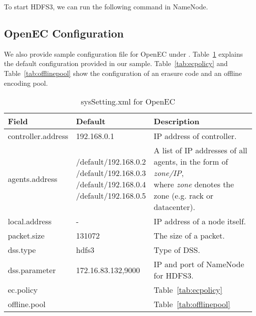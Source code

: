 \documentclass[letterpaper,12pt]{article}
\newcommand{\openec}{{\sf\small OpenEC}\xspace}
\begin{document}
To start HDFS3, we can run the following command in NameNode.

\begin{center}
\noindent{}
\end{center}

\subsection{OpenEC Configuration}

We also provide sample configuration file for \openec under .
Table~\ref{tab:sysSetting} explains the default configuration provided in our sample.
Table~\ref{tab:ecpolicy} and Table~\ref{tab:offlinepool} show the configuration of an
erasure code and an offline encoding pool.

\begin{table}[!t]
\centering
\footnotesize
\renewcommand{\arraystretch}{1.1}
\begin{tabular}{|l|l|l|}
\hline
Field & Default & Description \\
\hline
\hline
controller.address & 192.168.0.1 & IP address of controller. \\
\hline
agents.address & \makecell[l]{/default/192.168.0.2 \\ /default/192.168.0.3 \\ /default/192.168.0.4 \\ /default/192.168.0.5} & \makecell[l]{A list of IP addresses of all agents, in the form of {\sl zone/IP}, \\where {\sl zone} denotes the zone (e.g. rack or datacenter).} \\
\hline
local.address & - & IP address of a node itself. \\ 
\hline
packet.size & 131072 & The size of a packet. \\
\hline
dss.type & hdfs3 & Type of DSS. \\
\hline
dss.parameter & 172.16.83.132,9000 & IP and port of NameNode for HDFS3. \\
\hline
ec.policy & & Table~\ref{tab:ecpolicy}\\
\hline
offline.pool & & Table~\ref{tab:offlinepool}\\
\hline
\end{tabular}
\vspace{-3pt}
\caption{sysSetting.xml for \openec}
\label{tab:sysSetting}
\end{table}
\end{document}
